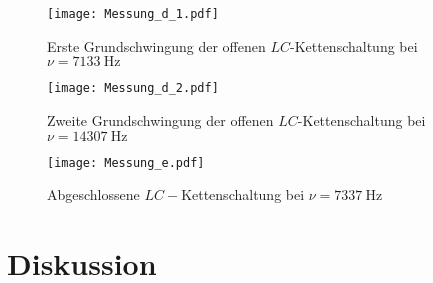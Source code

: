 \begin{figure}
  \texttt{[image: Messung\_d\_1.pdf]}
  \caption{Erste Grundschwingung der offenen $LC$-Kettenschaltung bei $\nu = \SI{7133}{\hertz}$}
  \label{fig:Messungd1}
\end{figure}

\begin{figure}
  \texttt{[image: Messung\_d\_2.pdf]}
  \caption{Zweite Grundschwingung der offenen $LC$-Kettenschaltung bei $\nu = \SI{14307}{\hertz}$}
  \label{fig:Messungd2}
\end{figure}

\begin{figure}
  \texttt{[image: Messung\_e.pdf]}
  \caption{Abgeschlossene $LC-$Kettenschaltung bei $\nu = \SI{7337}{\hertz}$}
  \label{fig:Messunge}
\end{figure}

\section{Diskussion}

